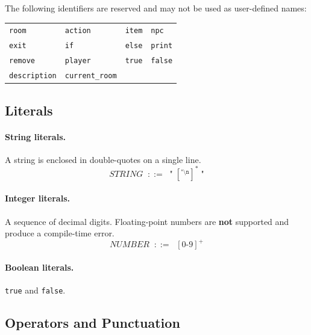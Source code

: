 \documentclass[12pt, a4paper]{article}
\begin{document}
The following identifiers are reserved and may not be used as user-defined names:

\begin{center}
\begin{tabular}{llll}
\toprule
\texttt{room} & \texttt{action} & \texttt{item} & \texttt{npc} \\
\texttt{exit} & \texttt{if} & \texttt{else} & \texttt{print} \\
\texttt{remove} & \texttt{player} & \texttt{true} & \texttt{false} \\
\texttt{description} & \texttt{current\_room} & & \\
\bottomrule
\end{tabular}
\end{center}

\subsection{Literals}

\paragraph{String literals.}
A string is enclosed in double-quotes on a single line.
\[
  \textit{STRING} \;\;::=\;\; \texttt{"} \; [^\texttt{"\textbackslash n}]^* \; \texttt{"}
\]

\paragraph{Integer literals.}
A sequence of decimal digits. Floating-point numbers are \textbf{not} supported and
produce a compile-time error.
\[
  \textit{NUMBER} \;\;::=\;\; [0\text{-}9]^+
\]

\paragraph{Boolean literals.} \texttt{true} and \texttt{false}.

\subsection{Operators and Punctuation}
\end{document}
